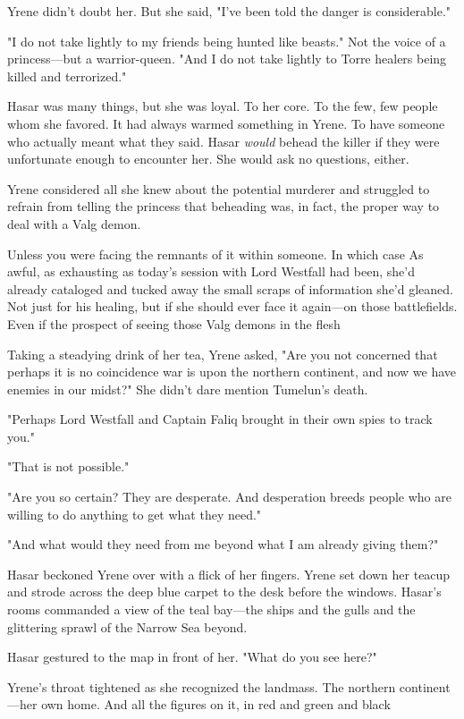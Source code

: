 Yrene didn't doubt her. But she said, "I've been told the danger is
 considerable."

"I do not take lightly to my friends being hunted like beasts." Not the voice of a princess---but a warrior-queen. "And I do not take lightly to Torre healers being killed and terrorized."

Hasar was many things, but she was loyal. To her core. To the few, few people whom she favored. It had always warmed something in Yrene. To have someone who actually meant what they said. Hasar \emph{would}
behead the killer if they were unfortunate enough to encounter her. She would ask no questions, either.

Yrene considered all she knew about the potential murderer and struggled to refrain from telling the princess that beheading was, in fact, the proper way to deal with a Valg demon.

Unless you were facing the remnants of it within someone. In which case
 As awful, as exhausting as today's session with Lord Westfall had been, she'd already cataloged and tucked away the small scraps of information she'd gleaned. Not just for his healing, but if she should ever face it again---on those battlefields. Even if the prospect of seeing those Valg demons in the flesh 

Taking a steadying drink of her tea, Yrene asked, "Are you not concerned that perhaps it is no coincidence war is upon the northern continent, and now we have enemies in our midst?" She didn't dare mention Tumelun's death.

"Perhaps Lord Westfall and Captain Faliq brought in their own spies to track you."

"That is not possible."

"Are you so certain? They are desperate. And desperation breeds people who are willing to do anything to get what they need."

"And what would they need from me beyond what I am already giving them?"

Hasar beckoned Yrene over with a flick of her fingers. Yrene set down her teacup and strode across the deep blue carpet to the desk before the windows. Hasar's rooms commanded a view of the teal bay---the ships and the gulls and the glittering sprawl of the Narrow Sea beyond.

Hasar gestured to the map in front of her. "What do you see here?"

Yrene's throat tightened as she recognized the landmass. The northern continent---her own home. And all the figures on it, in red and green and black



